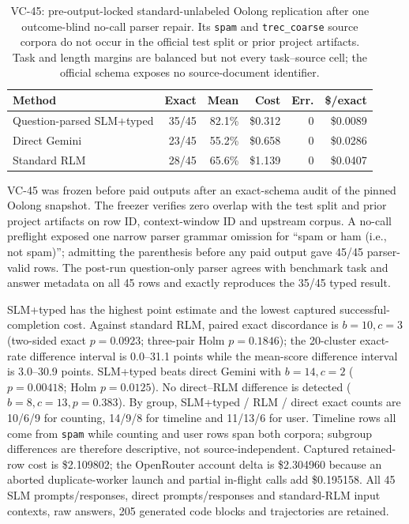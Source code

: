 \begin{table}[!t]
\centering
\small
\setlength{\tabcolsep}{3pt}
\begin{tabular}{@{}lrrrrr@{}}
\toprule
\textbf{Method} & \textbf{Exact} & \textbf{Mean} & \textbf{Cost} & \textbf{Err.} & \textbf{\$/exact} \\
\midrule
Question-parsed SLM+typed & 35/45 & 82.1\% & \$0.312 & 0 & \$0.0089 \\
Direct Gemini & 23/45 & 55.2\% & \$0.658 & 0 & \$0.0286 \\
Standard RLM & 28/45 & 65.6\% & \$1.139 & 0 & \$0.0407 \\
\bottomrule
\end{tabular}
\caption{VC-45: pre-output-locked standard-unlabeled Oolong replication after one outcome-blind no-call parser repair. Its \texttt{spam} and \texttt{trec\_coarse} source corpora do not occur in the official test split or prior project artifacts. Task and length margins are balanced but not every task--source cell; the official schema exposes no source-document identifier.}
\label{tab:supp-oolong-validation-corpus-disjoint-n45}
\end{table}

VC-45 was frozen before paid outputs after an exact-schema audit of the pinned Oolong snapshot. The freezer verifies zero overlap with the test split and prior project artifacts on row ID, context-window ID and upstream corpus. A no-call preflight exposed one narrow parser grammar omission for ``spam or ham (i.e., not spam)''; admitting the parenthesis before any paid output gave 45/45 parser-valid rows. The post-run question-only parser agrees with benchmark task and answer metadata on all 45 rows and exactly reproduces the 35/45 typed result.

SLM+typed has the highest point estimate and the lowest captured successful-completion cost. Against standard RLM, paired exact discordance is $b=10,c=3$ (two-sided exact $p=0.0923$; three-pair Holm $p=0.1846$); the 20-cluster exact-rate difference interval is 0.0--31.1 points while the mean-score difference interval is 3.0--30.9 points. SLM+typed beats direct Gemini with $b=14,c=2$ ($p=0.00418$; Holm $p=0.0125$). No direct--RLM difference is detected ($b=8,c=13,p=0.383$). By group, SLM+typed / RLM / direct exact counts are 10/6/9 for counting, 14/9/8 for timeline and 11/13/6 for user. Timeline rows all come from \texttt{spam} while counting and user rows span both corpora; subgroup differences are therefore descriptive, not source-independent. Captured retained-row cost is \$2.109802; the OpenRouter account delta is \$2.304960 because an aborted duplicate-worker launch and partial in-flight calls add \$0.195158. All 45 SLM prompts/responses, direct prompts/responses and standard-RLM input contexts, raw answers, 205 generated code blocks and trajectories are retained.

